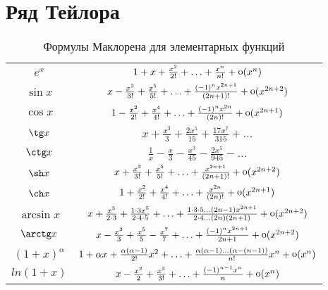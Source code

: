 \section*{Ряд Тейлора}

\begin{table}[h]
	\centering
	\caption{Формулы Маклорена для элементарных функций}

	\begin{tabular}{c|c}
	\phantom{$\dfrac{42}{42}$} $e^x$ & $1 + x + \frac{x^2}{2 !} + \ldots + \frac{x^n}{n !} + \mathop{\mathrm{o}}\nolimits (x^n)$ \\

	\phantom{$\dfrac{42}{42}$}$\sin x$ & $x - \frac{x^3}{3!} + \frac{x^5}{5 !} + \ldots + \frac{(-1)^n x^{2n+1}}{(2n + 1) !} + \mathop{\mathrm{o}}\nolimits(x^{2n+2})$ \\
 	
 	\phantom{$\dfrac{42}{42}$}$\cos x$ & $1 - \frac{x^2}{2 !} + \frac{x^4}{4 !} + \ldots + \frac{(-1)^n x^{2n}}{(2n)!} + \mathop{\mathrm{o}}\nolimits(x^{2n+1})$ \\

 	\phantom{$\dfrac{42}{42}$}$\tg x$& $x + \frac{x^3}{3} + \frac{2x^5}{15} + \frac{17 x^7}{315} + \ldots$ \\

	\phantom{$\dfrac{42}{42}$} $\ctg x$& $\frac{1}{x} - \frac{x}{3} - \frac{x^3}{45} - \frac{2x^5}{945} - \ldots$ \\ 	
	
	\phantom{$\dfrac{42}{42}$}$\sh x$ & $x + \frac{x^3}{3 !} + \frac{x^5}{5 !} + \ldots + \frac{x^{2n+1}}{(2n + 1) !} + \mathop{\mathrm{o}}\nolimits(x^{2n+2})$ \\
 	
 	\phantom{$\dfrac{42}{42}$}$\ch x$ & $1 + \frac{x^2}{2 !} + \frac{x^4}{4 !} + \ldots + \frac{x^{2n}}{(2n)!} + \mathop{\mathrm{o}}\nolimits(x^{2n+1})$\\

 	\phantom{$\dfrac{42}{42}$} $\arcsin x$ & $x + \frac{x^3}{2 \cdot 3} + \frac{1 \cdot 3 x^5}{2 \cdot 4 \cdot 5} + \ldots + \frac{1 \cdot 3 \cdot 5 \ldots (2n -1) x^{2n+1}}{2 \cdot 4 \ldots (2n)(2n+1)} + \mathop{\mathrm{o}}\nolimits(x^{2n+2})$ \\

 	\phantom{$\dfrac{42}{42}$}$\arctg x$ & $x - \frac{x^3}{3} + \frac{x^5}{5} - \frac{x^7}{7} + \ldots + \frac{(-1)^n x^{2n+1}}{2n+1} + \mathop{\mathrm{o}}\nolimits (x^{2n+2})$ \\
 	
 	\phantom{$\dfrac{42}{42}$}$(1 + x)^\alpha$ & $1 + \alpha x + \frac{\alpha (\alpha - 1) }{2 !}x^2 + \ldots + \frac{\alpha (\alpha - 1) \ldots (\alpha - (n-1))}{n!}x^n + \mathop{\mathrm{o}}\nolimits(x^n)$ \\

 	\phantom{$\dfrac{42}{42}$}$ln(1 + x)$ & $x - \frac{x^2}{2} + \frac{x^3}{3 !} + \ldots + \frac{(-1)^{n-1} x^n}{n} + \mathop{\mathrm{o}}\nolimits(x^n)$ \\
	\end{tabular}
\end{table}

